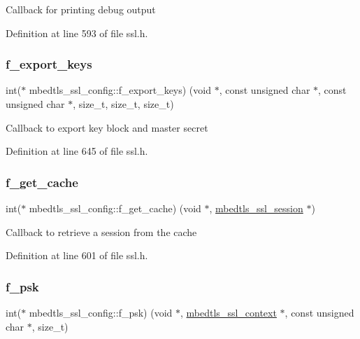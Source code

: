 Callback for printing debug output 

Definition at line 593 of file ssl.\+h.

\mbox{\label{structmbedtls__ssl__config_ac02042559727bfeff3dc7165019acece}} 
\subsubsection{\texorpdfstring{f\+\_\+export\+\_\+keys}{f\_export\_keys}}
{\footnotesize\ttfamily int($\ast$ mbedtls\+\_\+ssl\+\_\+config\+::f\+\_\+export\+\_\+keys) (void $\ast$, const unsigned char $\ast$, const unsigned char $\ast$, size\+\_\+t, size\+\_\+t, size\+\_\+t)}

Callback to export key block and master secret 

Definition at line 645 of file ssl.\+h.

\mbox{\label{structmbedtls__ssl__config_a92d52d27abd228e5e5293ea41b065d9a}} 
\subsubsection{\texorpdfstring{f\+\_\+get\+\_\+cache}{f\_get\_cache}}
{\footnotesize\ttfamily int($\ast$ mbedtls\+\_\+ssl\+\_\+config\+::f\+\_\+get\+\_\+cache) (void $\ast$, \mbox{\hyperlink{structmbedtls__ssl__session}{mbedtls\+\_\+ssl\+\_\+session}} $\ast$)}

Callback to retrieve a session from the cache 

Definition at line 601 of file ssl.\+h.

\mbox{\label{structmbedtls__ssl__config_aff5c457114c1490ab17c433d43955e34}} 
\subsubsection{\texorpdfstring{f\+\_\+psk}{f\_psk}}
{\footnotesize\ttfamily int($\ast$ mbedtls\+\_\+ssl\+\_\+config\+::f\+\_\+psk) (void $\ast$, \mbox{\hyperlink{structmbedtls__ssl__context}{mbedtls\+\_\+ssl\+\_\+context}} $\ast$, const unsigned char $\ast$, size\+\_\+t)}

